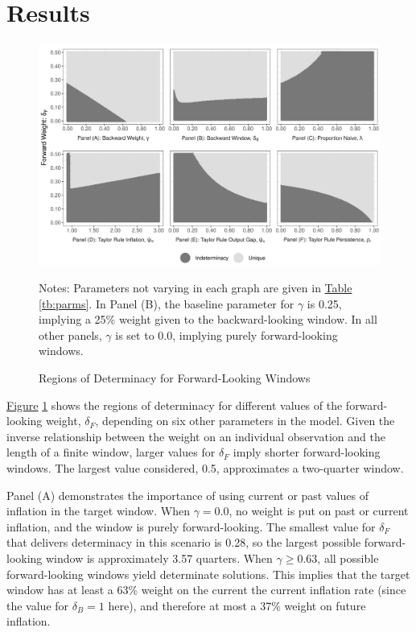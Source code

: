 \documentclass[english,authoryear,12pt]{elsarticle}
\begin{document}
\section{\label{Results}Results}

\begin{figure}
	\captionsetup{justification=centering}
	\begin{center}
		\includegraphics[width=\textwidth]{./determinacy_notitle.png}
		\vspace*{3pc}\hspace*{2pc}\parbox{0.9\textwidth}{\small{
			Notes: Parameters not varying in each graph are given in \href{tb:parms}{Table} \ref{tb:parms}. In Panel (B), the baseline parameter for $\gamma$ is 0.25, implying a 25\% weight given to the backward-looking window. In all other panels, $\gamma$ is set to 0.0, implying purely forward-looking windows.}
		}
	\end{center}
	\vspace*{-4pc}\caption{Regions of Determinacy for Forward-Looking Windows}\label{fg:determinacy}
\end{figure}

\href{fg:determinacy}{Figure} \ref{fg:determinacy} shows the regions of determinacy for different values of the forward-looking weight, $\delta_F$, depending on six other parameters in the model. Given the inverse relationship between the weight on an individual observation and the length of a finite window, larger values for $\delta_F$ imply shorter forward-looking windows. The largest value considered, 0.5, approximates a two-quarter window.

Panel (A) demonstrates the importance of using current or past values of inflation in the target window. When $\gamma=0.0$, no weight is put on past or current inflation, and the window is purely forward-looking. The smallest value for $\delta_F$ that delivers determinacy in this scenario is 0.28, so the largest possible forward-looking window is approximately 3.57 quarters. When $\gamma \geq 0.63$, all possible forward-looking windows yield determinate solutions. This implies that the target window has at least a 63\% weight on the current the current inflation rate (since the value for $\delta_B=1$ here), and therefore at most a 37\% weight on future inflation.
\end{document}
